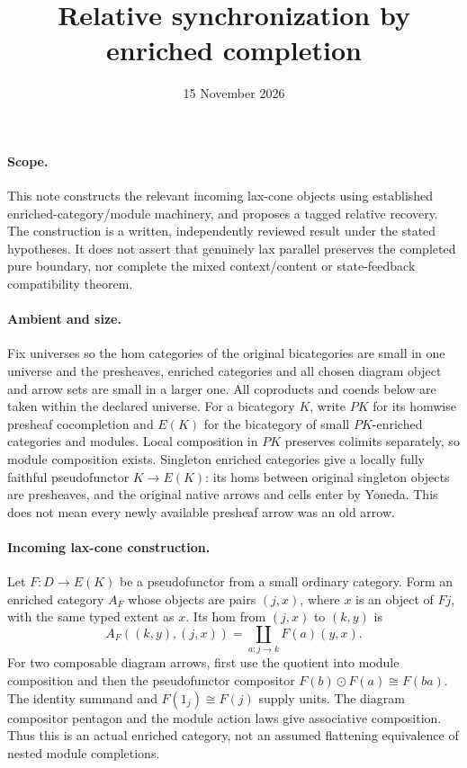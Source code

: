 \documentclass{article}
\title{Relative synchronization by enriched completion}
\date{15 November 2026}
\begin{document}
\maketitle
\paragraph{Scope.} This note constructs the relevant incoming lax-cone objects using established enriched-category/module machinery, and proposes a tagged relative recovery. The construction is a written, independently reviewed result under the stated hypotheses. It does not assert that genuinely lax parallel preserves the completed pure boundary, nor complete the mixed context/content or state-feedback compatibility theorem.

\paragraph{Ambient and size.} Fix universes so the hom categories of the original bicategories are small in one universe and the presheaves, enriched categories and all chosen diagram object and arrow sets are small in a larger one. All coproducts and coends below are taken within the declared universe. For a bicategory $K$, write $PK$ for its homwise presheaf cocompletion and $E(K)$ for the bicategory of small $PK$-enriched categories and modules. Local composition in $PK$ preserves colimits separately, so module composition exists. Singleton enriched categories give a locally fully faithful pseudofunctor $K\to E(K)$: its homs between original singleton objects are presheaves, and the original native arrows and cells enter by Yoneda. This does not mean every newly available presheaf arrow was an old arrow.

\paragraph{Incoming lax-cone construction.} Let $F:D\to E(K)$ be a pseudofunctor from a small ordinary category. Form an enriched category $A_F$ whose objects are pairs $(j,x)$, where $x$ is an object of $Fj$, with the same typed extent as $x$. Its hom from $(j,x)$ to $(k,y)$ is
\[
 A_F((k,y),(j,x))=\coprod_{a:j\to k}F(a)(y,x).
\]
For two composable diagram arrows, first use the quotient into module composition and then the pseudofunctor compositor $F(b)\odot F(a)\cong F(ba)$. The identity summand and $F(1_j)\cong F(j)$ supply units. The diagram compositor pentagon and the module action laws give associative composition. Thus this is an actual enriched category, not an assumed flattening equivalence of nested module completions.
\end{document}
